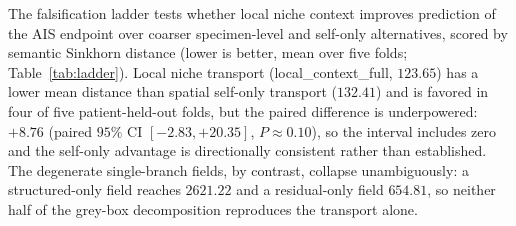 The falsification ladder tests whether local niche context improves prediction of the AIS endpoint over coarser specimen-level and self-only alternatives, scored by semantic Sinkhorn distance (lower is better, mean over five folds; Table~\ref{tab:ladder}). Local niche transport (local\_context\_full, $123.65$) has a lower mean distance than spatial self-only transport ($132.41$) and is favored in four of five patient-held-out folds, but the paired difference is underpowered: $+8.76$ (paired $95\%$ CI $[-2.83, +20.35]$, $P \approx 0.10$), so the interval includes zero and the self-only advantage is directionally consistent rather than established. The degenerate single-branch fields, by contrast, collapse unambiguously: a structured-only field reaches $2621.22$ and a residual-only field $654.81$, so neither half of the grey-box decomposition reproduces the transport alone.


